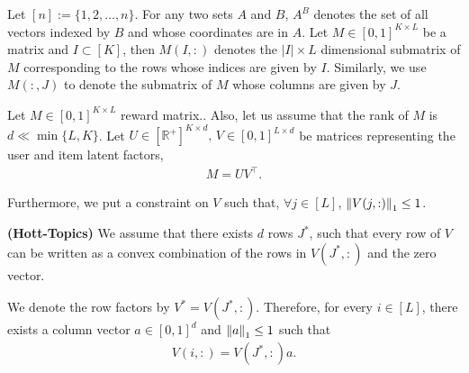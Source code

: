 
Let $[n] := \lbrace 1,2,\ldots, n\rbrace$. For any two sets $A$ and $B$, $A^B$ denotes the set of all vectors indexed by $B$ and whose coordinates are in $A$. Let $M\in [0,1]^{K\times L}$ be a matrix and $I \subset [K] $, then $M(I,:)$ denotes the $|I| \times L$ dimensional submatrix of $M$ corresponding to the rows whose indices are given by $I$. Similarly, we use $M(:,J)$ to denote the submatrix of $M$ whose columns are given by $J$.
	
	Let $M \in  [0,1]^{K \times L}$  reward matrix.. Also, let us assume that the rank of  $M$ is $d \ll \min\lbrace L,K\rbrace$. Let $ U \in [ \mathbb{R}^+ ]^{K\times d} \textbf{, } V \in  [0,1]^{L\times d}$ be matrices representing the user and item latent factors, 
\begin{align*}
	M = UV^{\intercal} .
\end{align*}	  
	
	
	Furthermore, we put a constraint on $V$ such that, $\forall j\in [L]$, $ \left\lVert V(j,:)\right\rVert_1 \leq 1$. 
	 
	
	
\begin{assumption}\textbf{(Hott-Topics)}
\label{assm:hott-topics}
We assume that there exists $d$ rows $J^*$,  such that every row of $V$ can be written as a convex combination of the rows in $V(J^*,:)$ and the zero vector. 
\end{assumption}
We denote the row factors by $V^* = V(J^*,:)$. Therefore, for every $i\in [L]$, there exists a column vector $a \in [0,1]^{d}$ and $ \left\lVert a\right\rVert_1 \leq 1$ such that 
\begin{align*}
V(i,:) = V(J^*,:) a.
\end{align*}




%
%
%

